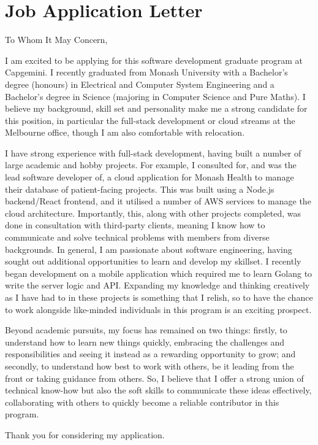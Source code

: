 \section{Job Application Letter}

To Whom It May Concern,

I am excited to be applying for this software development graduate program at Capgemini. I recently graduated from Monash University with a Bachelor's degree (honours) in Electrical and Computer System Engineering and a Bachelor's degree in Science (majoring in Computer Science and Pure Maths). I believe my background, skill set and personality make me a strong candidate for this position, in particular the full-stack development or cloud streams at the Melbourne office, though I am also comfortable with relocation.

I have strong experience with full-stack development, having built a number of large academic and hobby projects. For example, I consulted for, and was the lead software developer of, a cloud application for Monash Health to manage their database of patient-facing projects. This was built using a Node.js backend/React frontend, and it utilised a number of AWS services to manage the cloud architecture. Importantly, this, along with other projects completed, was done in consultation with third-party clients, meaning I know how to communicate and solve technical problems with members from diverse backgrounds. In general, I am passionate about software engineering, having sought out additional opportunities to learn and develop my skillset. I recently began development on a mobile application which required me to learn Golang to write the server logic and API. Expanding my knowledge and thinking creatively as I have had to in these projects is something that I relish, so to have the chance to work alongside like-minded individuals in this program is an exciting prospect.

Beyond academic pursuits, my focus has remained on two things: firstly, to understand how to learn new things quickly, embracing the challenges and responsibilities and seeing it instead as a rewarding opportunity to grow; and secondly, to understand how best to work with others, be it leading from the front or taking guidance from others. So, I believe that I offer a strong union of technical know-how but also the soft skills to communicate these ideas effectively, collaborating with others to quickly become a reliable contributor in this program.

Thank you for considering my application.
